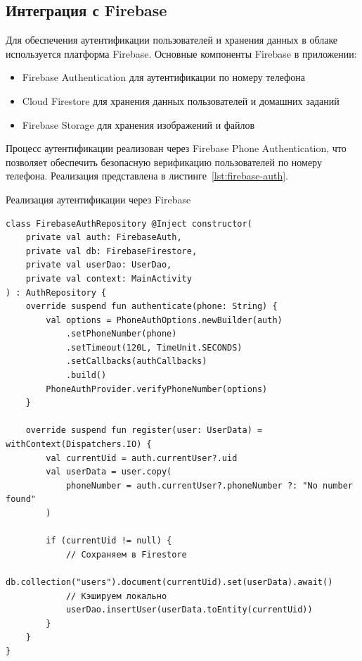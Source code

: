 \documentclass[14pt, russian]{scrartcl}
\begin{document}
\subsection{Интеграция с Firebase}\label{sect:firebase}

Для обеспечения аутентификации пользователей и хранения данных в облаке используется платформа Firebase. Основные компоненты Firebase в приложении:

\begin{itemize}
\item Firebase Authentication для аутентификации по номеру телефона
\item Cloud Firestore для хранения данных пользователей и домашних заданий
\item Firebase Storage для хранения изображений и файлов
\end{itemize}

Процесс аутентификации реализован через Firebase Phone Authentication, что позволяет обеспечить безопасную верификацию пользователей по номеру телефона. Реализация представлена в листинге~\ref{lst:firebase-auth}.

\begin{listing}[!htb]
\caption{Реализация аутентификации через Firebase}
\vspace{-0.3cm}
\label{lst:firebase-auth}
\begin{verbatim}
class FirebaseAuthRepository @Inject constructor(
    private val auth: FirebaseAuth,
    private val db: FirebaseFirestore,
    private val userDao: UserDao,
    private val context: MainActivity
) : AuthRepository {
    override suspend fun authenticate(phone: String) {
        val options = PhoneAuthOptions.newBuilder(auth)
            .setPhoneNumber(phone)
            .setTimeout(120L, TimeUnit.SECONDS)
            .setCallbacks(authCallbacks)
            .build()
        PhoneAuthProvider.verifyPhoneNumber(options)
    }

    override suspend fun register(user: UserData) = withContext(Dispatchers.IO) {
        val currentUid = auth.currentUser?.uid
        val userData = user.copy(
            phoneNumber = auth.currentUser?.phoneNumber ?: "No number found"
        )

        if (currentUid != null) {
            // Сохраняем в Firestore
            db.collection("users").document(currentUid).set(userData).await()
            // Кэшируем локально
            userDao.insertUser(userData.toEntity(currentUid))
        }
    }
}
\end{verbatim}
\end{listing}
\end{document}
